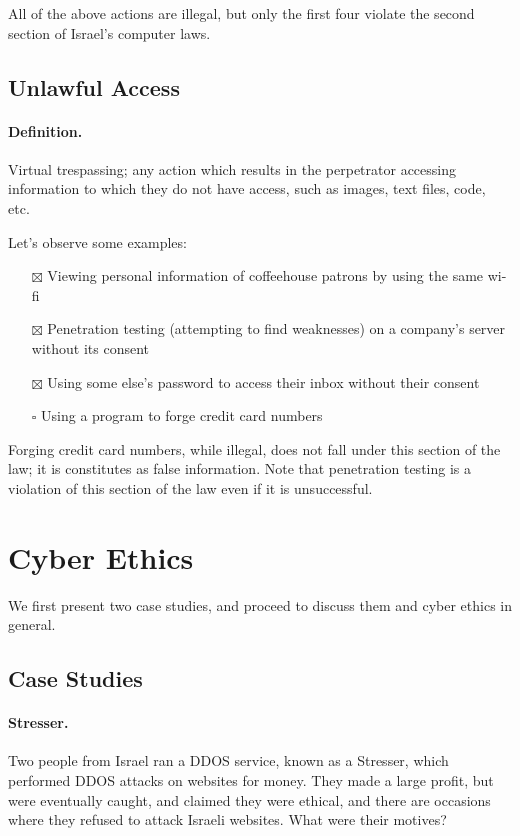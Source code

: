 All of the above actions are illegal, but only the first four violate the second
section of Israel's computer laws.

\subsection{Unlawful Access}

\paragraph{Definition.} Virtual trespassing; any action which results in the
perpetrator accessing information to which they do not have access, such as
images, text files, code, etc.

Let's observe some examples:
\begin{itemize}
    \item[$\boxtimes$] Viewing personal information of coffeehouse patrons by
    using the same wi-fi
    \item[$\boxtimes$] Penetration testing (attempting to find weaknesses) on a
    company's server without its consent
    \item[$\boxtimes$] Using some else's password to access their inbox without
    their consent
    \item[$\square$] Using a program to forge credit card numbers
\end{itemize}

Forging credit card numbers, while illegal, does not fall under this section of
the law; it is constitutes as false information. Note that penetration testing
is a violation of this section of the law even if it is unsuccessful.

\section{Cyber Ethics}\label{sec:cyber_ethics}

We first present two case studies, and proceed to discuss them and cyber ethics
in general.

\subsection{Case Studies}

\paragraph{Stresser.} Two people from Israel ran a DDOS service, known as a
Stresser, which performed DDOS attacks on websites for money. They made a large
profit, but were eventually caught, and claimed they were ethical, and there are
occasions where they refused to attack Israeli websites. What were their
motives?

